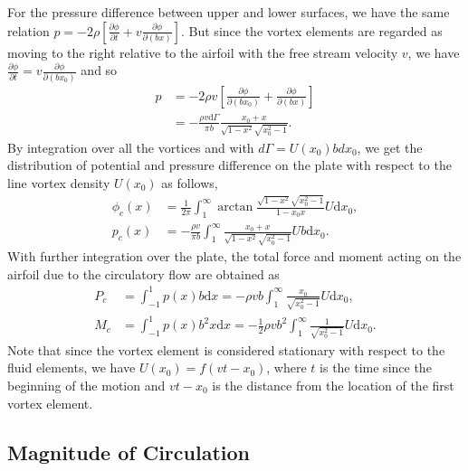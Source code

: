 For the pressure difference between upper and lower surfaces, we have the same relation $p = -2\rho[\frac{\partial \phi}{\partial t} + v\frac{\partial \phi}{\partial (bx)}]$.
But since the vortex elements are regarded as moving to the right relative to the airfoil with the free stream velocity $v$,  we have $\frac{\partial \phi}{\partial t} = v\frac{\partial \phi}{\partial (bx_0)}$ and so 
\begin{align}
p & = -2\rho v[\frac{\partial \phi}{\partial (bx_0)} + \frac{\partial \phi}{\partial (bx)}]  \\
  &  = -\frac{\rho v \mathrm{d}\Gamma}{\pi b} \frac{x_0+x}{\sqrt{1-x^2}\sqrt{x_0^2-1}}.
\end{align}
By integration over all the vortices and with $d\Gamma = U(x_0)bdx_0$, we get the distribution of potential and pressure difference on the plate with respect to the line vortex density $U(x_0)$ as follows,
\begin{align}
\phi_c(x) & =  \frac{1}{2\pi} \int_{1}^{\infty}\arctan \frac{\sqrt{1-x^2}\sqrt{x_0^2-1}}{1-x_0x}U\mathrm{d}x_0, \\
p_c(x) &  =  -\frac{\rho v }{\pi b} \int_{1}^{\infty}\frac{x_0+x}{\sqrt{1-x^2}\sqrt{x_0^2-1}} Ub\mathrm{d}x_0.
\end{align}
With further integration over the plate, the total force and moment acting on the airfoil due to the circulatory flow are obtained as
\begin{align}
P_c & =  \int_{-1}^{1} p(x) b \mathrm{d}x
   =  -\rho v b \int_{1}^{\infty} \frac{x_0}{\sqrt{x_0^2-1}} U \mathrm{d}x_0, \\
M_c & =  \int_{-1}^{1} p(x) b^2 x \mathrm{d}x
   =   - \frac{1}{2} \rho v b^2 \int_{1}^{\infty} \frac{1}{\sqrt{x_0^2-1}} U \mathrm{d}x_0.
\end{align}
Note that since the vortex element is considered stationary with respect to the fluid elements, we have $U(x_0) = f(vt - x_0)$, where $t$ is the time since the beginning of the motion and $vt-x_0$ is the distance from the location of the first vortex element.


\subsection{Magnitude of Circulation}

